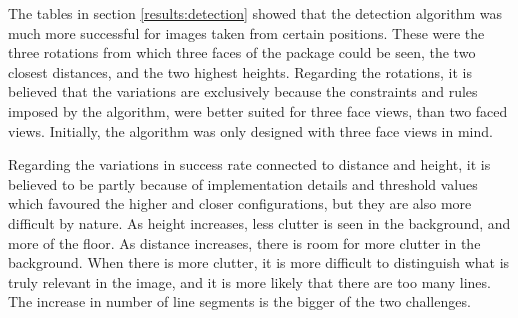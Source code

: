 The tables in section \ref{results:detection} showed that the detection algorithm was much more successful for images taken from certain positions.
These were the three rotations from which three faces of the package could be seen, the two closest distances, and the two highest heights.
Regarding the rotations, it is believed that the variations are exclusively because the constraints and rules imposed by the algorithm, were better suited for three face views, than two faced views.
Initially, the algorithm was only designed with three face views in mind.

Regarding the variations in success rate connected to distance and height, it is believed to be partly because of implementation details and threshold values which favoured the higher and closer configurations, but they are also more difficult by nature.
As height increases, less clutter is seen in the background, and more of the floor.
As distance increases, there is room for more clutter in the background.
When there is more clutter, it is more difficult to distinguish what is truly relevant in the image, and it is more likely that there are too many lines.
The increase in number of line segments is the bigger of the two challenges.



%


